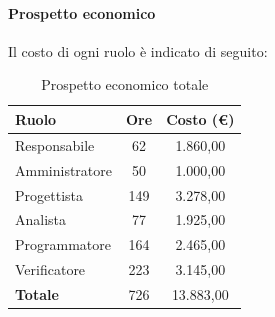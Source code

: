 \documentclass[../PianoDiProgetto_v3.0.0.tex]{subfiles}
\begin{document}
			\newpage
			\paragraph{Prospetto economico}
			Il costo di ogni ruolo è indicato di seguito:
			\begin{table}[h]
				\centering
				\begin{tabular}{l * {2}{c}}
				\toprule
				\textbf{Ruolo} & \textbf{Ore} & \textbf{Costo (\euro{})} \\
				\midrule
				Responsabile & 62 & 1.860,00 \\
				Amministratore & 50 & 1.000,00 \\
				Progettista & 149 & 3.278,00 \\
				Analista & 77 & 1.925,00 \\		
				Programmatore & 164 & 2.465,00 \\		
				Verificatore & 223 & 3.145,00 \\				
				\midrule		
				\textbf{Totale} & 726 & 13.883,00 \\
				\bottomrule	
				\end{tabular}
				\caption{Prospetto economico totale}		
			\end{table}
			
\end{document}
